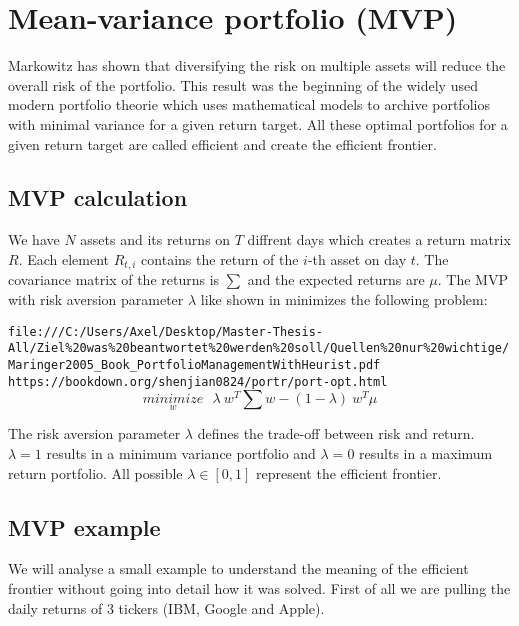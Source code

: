 \documentclass[
  oneside]{book}
\begin{document}
\hypertarget{mean-variance-portfolio-mvp}{%
\section{Mean-variance portfolio (MVP)}\label{mean-variance-portfolio-mvp}}

Markowitz has shown that diversifying the risk on multiple assets will reduce the overall risk of the portfolio. This result was the beginning of the widely used modern portfolio theorie which uses mathematical models to archive portfolios with minimal variance for a given return target. All these optimal portfolios for a given return target are called efficient and create the efficient frontier.

\hypertarget{mvp-calculation}{%
\subsection{MVP calculation}\label{mvp-calculation}}

We have \(N\) assets and its returns on \(T\) diffrent days which creates a return matrix \(R\). Each element \(R_{t,i}\) contains the return of the \(i\)-th asset on day \(t\). The covariance matrix of the returns is \(\textstyle\sum\) and the expected returns are \(\mu\). The MVP with risk aversion parameter \(\lambda\) like shown in \citep{Mar2005} minimizes the following problem:

\texttt{file:///C:/Users/Axel/Desktop/Master-Thesis-All/Ziel\%20was\%20beantwortet\%20werden\%20soll/Quellen\%20nur\%20wichtige/Maringer2005\_Book\_PortfolioManagementWithHeurist.pdf}
\texttt{https://bookdown.org/shenjian0824/portr/port-opt.html}
\begin{equation} 
\underset{w}{minimize} \ \ \ \lambda \ w^T \textstyle\sum w - (1-\lambda) \ w^T\mu
\label{eq:MVP}
\end{equation}

The risk aversion parameter \(\lambda\) defines the trade-off between risk and return. \(\lambda = 1\) results in a minimum variance portfolio and \(\lambda = 0\) results in a maximum return portfolio. All possible \(\lambda \in [0, 1]\) represent the efficient frontier.

\hypertarget{mvp-example}{%
\subsection{MVP example}\label{mvp-example}}

We will analyse a small example to understand the meaning of the efficient frontier without going into detail how it was solved. First of all we are pulling the daily returns of 3 tickers (IBM, Google and Apple).
\end{document}
